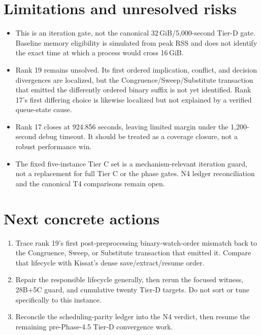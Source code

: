 \documentclass[11pt]{article}
\begin{document}
\section*{Limitations and unresolved risks}
\begin{itemize}
\item This is an iteration gate, not the canonical 32\,GiB/5,000-second Tier-D
gate.  Baseline memory eligibility is simulated from peak RSS and does not
identify the exact time at which a process would cross 16\,GiB.
\item Rank 19 remains unsolved.  Its first ordered implication, conflict, and
decision divergences are localized, but the Congruence/Sweep/Substitute
transaction that emitted the differently ordered binary suffix is not yet
identified.  Rank 17's first differing choice is likewise localized but not
explained by a verified queue-state cause.
\item Rank 17 closes at 924.856 seconds, leaving limited margin under the
1,200-second debug timeout.  It should be treated as a coverage closure, not a
robust performance win.
\item The fixed five-instance Tier C set is a mechanism-relevant iteration
guard, not a replacement for full Tier C or the phase gates.  N4 ledger
reconciliation and the canonical T4 comparisons remain open.
\end{itemize}

\section*{Next concrete actions}
\begin{enumerate}
\item Trace rank 19's first post-preprocessing binary-watch-order mismatch back
to the Congruence, Sweep, or Substitute transaction that emitted it.  Compare
that lifecycle with Kissat's dense save/extract/resume order.
\item Repair the responsible lifecycle generally, then rerun the focused
witness, 28B+5C guard, and cumulative twenty Tier-D targets.  Do not sort or
tune specifically to this instance.
\item Reconcile the scheduling-parity ledger into the N4 verdict, then resume
the remaining pre-Phase-4.5 Tier-D convergence work.
\end{enumerate}
\end{document}
